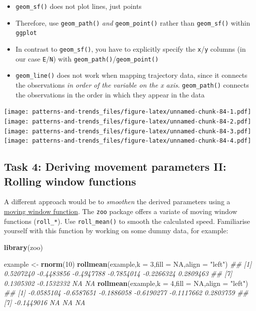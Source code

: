 \documentclass[]{book}
\newenvironment{Shaded}{\begin{snugshade}}{\end{snugshade}}
\newcommand{\CommentTok}[1]{\textcolor[rgb]{0.56,0.35,0.01}{\textit{#1}}}
\newcommand{\DataTypeTok}[1]{\textcolor[rgb]{0.13,0.29,0.53}{#1}}
\newcommand{\DecValTok}[1]{\textcolor[rgb]{0.00,0.00,0.81}{#1}}
\newcommand{\KeywordTok}[1]{\textcolor[rgb]{0.13,0.29,0.53}{\textbf{#1}}}
\newcommand{\NormalTok}[1]{#1}
\newcommand{\OtherTok}[1]{\textcolor[rgb]{0.56,0.35,0.01}{#1}}
\newcommand{\StringTok}[1]{\textcolor[rgb]{0.31,0.60,0.02}{#1}}
\providecommand{\tightlist}{%
  \setlength{\itemsep}{0pt}\setlength{\parskip}{0pt}}
\begin{document}
\begin{itemize}
\tightlist
\item
  \texttt{geom\_sf()} does not plot lines, just points
\item
  Therefore, use \texttt{geom\_path()} \emph{and} \texttt{geom\_point()} rather than \texttt{geom\_sf()} within \texttt{ggplot}
\item
  In contrast to \texttt{geom\_sf()}, you have to explicitly specify the \texttt{x}/\texttt{y} columns (in our case \texttt{E}/\texttt{N}) with \texttt{geom\_path()}/\texttt{geom\_point()}
\item
  \texttt{geom\_line()} does not work when mapping trajectory data, since it connects the observations \emph{in order of the variable on the x axis}. \texttt{geom\_path()} connects the observations in the order in which they appear in the data
\end{itemize}

\texttt{[image: patterns-and-trends\_files/figure-latex/unnamed-chunk-84-1.pdf]} \texttt{[image: patterns-and-trends\_files/figure-latex/unnamed-chunk-84-2.pdf]} \texttt{[image: patterns-and-trends\_files/figure-latex/unnamed-chunk-84-3.pdf]} \texttt{[image: patterns-and-trends\_files/figure-latex/unnamed-chunk-84-4.pdf]}

\hypertarget{task-4-deriving-movement-parameters-ii-rolling-window-functions}{%
\subsection{Task 4: Deriving movement parameters II: Rolling window functions}\label{task-4-deriving-movement-parameters-ii-rolling-window-functions}}

A different approach would be to \emph{smoothen} the derived parameters using a \href{https://docs.wavefront.com/images/5sec_moving_window.png}{moving window function}. The \texttt{zoo} package offers a variate of moving window functions (\texttt{roll\_*}). Use \texttt{roll\_mean()} to smooth the calculated speed. Familiarise yourself with this function by working on some dummy data, for example:

\begin{Shaded}
\begin{Highlighting}[]

\KeywordTok{library}\NormalTok{(zoo)}

\NormalTok{example <-}\StringTok{ }\KeywordTok{rnorm}\NormalTok{(}\DecValTok{10}\NormalTok{)}
\KeywordTok{rollmean}\NormalTok{(example,}\DataTypeTok{k =} \DecValTok{3}\NormalTok{,}\DataTypeTok{fill =} \OtherTok{NA}\NormalTok{,}\DataTypeTok{align =} \StringTok{"left"}\NormalTok{)}
\CommentTok{##  [1]  0.5207240 -0.4483856 -0.4947788 -0.7854014 -0.2266324  0.2809463}
\CommentTok{##  [7]  0.1305302 -0.1532332         NA         NA}
\KeywordTok{rollmean}\NormalTok{(example,}\DataTypeTok{k =} \DecValTok{4}\NormalTok{,}\DataTypeTok{fill =} \OtherTok{NA}\NormalTok{,}\DataTypeTok{align =} \StringTok{"left"}\NormalTok{)}
\CommentTok{##  [1] -0.0585104 -0.6587651 -0.1886058 -0.6190277 -0.1117662  0.2803759}
\CommentTok{##  [7] -0.1449016         NA         NA         NA}
\end{Highlighting}
\end{Shaded}
\end{document}
